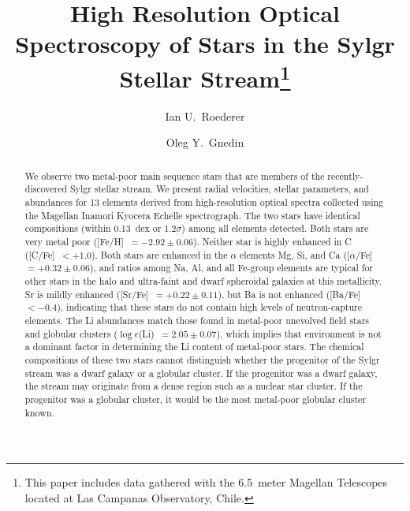 \documentclass[twocolumn,tighten]{aastex62}
\begin{document}
\title{%
High Resolution Optical Spectroscopy of Stars 
in the Sylgr Stellar Stream\footnote{%
This paper includes data gathered with the 6.5~meter 
Magellan Telescopes located at Las Campanas Observatory, Chile.}
}

\author{Ian U.\ Roederer}

\author{Oleg Y.\ Gnedin}

\begin{abstract}
We observe two metal-poor main sequence stars that are members
of the recently-discovered Sylgr stellar stream.
We present radial velocities, stellar parameters, and abundances
for 13 elements
derived from high-resolution optical spectra collected using the
Magellan Inamori Kyocera Echelle spectrograph.
The two stars have identical compositions
(within 0.13~dex or $1.2\sigma$) 
among all elements detected.
Both stars are very metal poor
([Fe/H]~$= -2.92 \pm 0.06$).
Neither star is highly enhanced in C
([C/Fe]~$< +1.0$).
Both stars are enhanced in the $\alpha$ elements Mg, Si, and Ca
([$\alpha$/Fe]~$= +0.32 \pm 0.06$), and
ratios among Na, Al, and all Fe-group elements are typical for other
stars in the halo and ultra-faint 
and dwarf spheroidal galaxies at this metallicity.
Sr is mildly enhanced
([Sr/Fe]~$= +0.22 \pm 0.11$),
but Ba is not enhanced
([Ba/Fe]~$< -0.4$),
indicating that these stars do not contain
high levels of neutron-capture elements.
The Li abundances match those found in metal-poor 
unevolved field stars and globular clusters
($\log\epsilon$(Li)~$= 2.05 \pm 0.07$), 
which implies that environment
is not a dominant factor in determining the Li content of
metal-poor stars.
The chemical compositions of these two stars
cannot distinguish whether the progenitor of the Sylgr stream
was a dwarf galaxy or a globular cluster.
If the progenitor was a dwarf galaxy,
the stream may originate from 
a dense region such as a nuclear star cluster.
If the progenitor was a globular cluster, 
it would be the 
most metal-poor globular cluster known.
\end{abstract}
\end{document}

